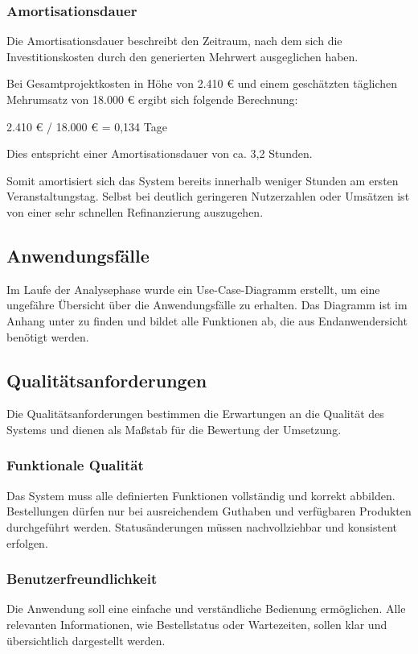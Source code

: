\subsubsection{Amortisationsdauer}
\label{sec:Amortisationsdauer}
Die Amortisationsdauer beschreibt den Zeitraum, nach dem sich die Investitionskosten durch den generierten Mehrwert ausgeglichen haben.

Bei Gesamtprojektkosten in Höhe von 2.410 € und einem geschätzten täglichen Mehrumsatz von 18.000 € ergibt sich folgende Berechnung:

2.410 € / 18.000 € = 0,134 Tage

Dies entspricht einer Amortisationsdauer von ca. 3,2 Stunden.

Somit amortisiert sich das System bereits innerhalb weniger Stunden am ersten Veranstaltungstag. Selbst bei deutlich geringeren Nutzerzahlen
oder Umsätzen ist von einer sehr schnellen Refinanzierung auszugehen.

\subsection{Anwendungsfälle}
\label{sec:Anwendungsfaelle}
Im Laufe der Analysephase wurde ein Use-Case-Diagramm erstellt, um eine ungefähre Übersicht über die Anwendungsfälle zu erhalten.
Das Diagramm ist im Anhang unter  zu finden und bildet alle Funktionen ab, die aus Endanwendersicht benötigt werden.

\subsection{Qualitätsanforderungen}
\label{sec:Qualitaetsanforderungen}
Die Qualitätsanforderungen bestimmen die Erwartungen an die Qualität des Systems und dienen als Maßstab für die Bewertung der Umsetzung.

\subsubsection{Funktionale Qualität}
Das System muss alle definierten Funktionen vollständig und korrekt abbilden. Bestellungen dürfen nur bei ausreichendem Guthaben und verfügbaren 
Produkten durchgeführt werden. Statusänderungen müssen nachvollziehbar und konsistent erfolgen.

\subsubsection{Benutzerfreundlichkeit}
Die Anwendung soll eine einfache und verständliche Bedienung ermöglichen. Alle relevanten Informationen, wie Bestellstatus oder Wartezeiten, sollen
klar und übersichtlich dargestellt werden.

